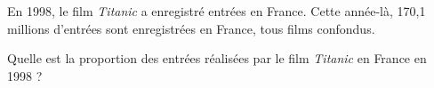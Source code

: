  
En 1998, le film \textit{Titanic} a enregistré  entrées  en France. Cette année-là, 170,1 millions d'entrées sont enregistrées en France, tous films confondus.

Quelle est la proportion des entrées réalisées par le film \textit{Titanic}  en France en 1998 ?


